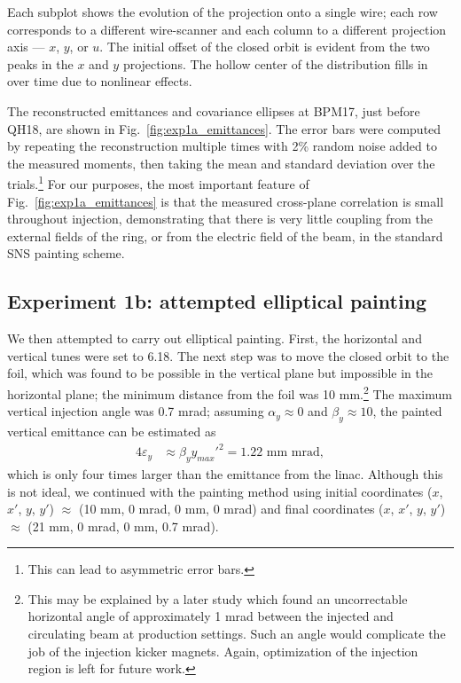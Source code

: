 %
Each subplot shows the evolution of the projection onto a single wire; each row corresponds to a different wire-scanner and each column to a different projection axis — $x$, $y$, or $u$. The initial offset of the closed orbit is evident from the two peaks in the $x$ and $y$ projections. The hollow center of the distribution fills in over time due to nonlinear effects.

The reconstructed emittances and covariance ellipses at BPM17, just before QH18, are shown in Fig.~\ref{fig:exp1a_emittances}. The error bars were computed by repeating the reconstruction multiple times with 2\% random noise added to the measured moments, then taking the mean and standard deviation over the trials.\footnote{This can lead to asymmetric error bars.} For our purposes, the most important feature of Fig.~\ref{fig:exp1a_emittances} is that the measured cross-plane correlation is small throughout injection, demonstrating that there is very little coupling from the external fields of the ring, or from the electric field of the beam, in the standard SNS painting scheme.


\subsection{Experiment 1b: attempted elliptical painting}

We then attempted to carry out elliptical painting. First, the horizontal and vertical tunes were set to 6.18. The next step was to move the closed orbit to the foil, which was found to be possible in the vertical plane but impossible in the horizontal plane; the minimum distance from the foil was 10 mm.\footnote{This may be explained by a later study which found an uncorrectable horizontal angle of approximately 1 mrad between the injected and circulating beam at production settings. Such an angle would complicate the job of the injection kicker magnets. Again, optimization of the injection region is left for future work.} The maximum vertical injection angle was 0.7 mrad; assuming $\alpha_y \approx 0$ and $\beta_y \approx 10$, the painted vertical emittance can be estimated as
%
\begin{equation}
\begin{aligned}
    4\varepsilon_y 
    &\approx \beta_y {y_{max}'}^2
    = 1.22 \,\, \text{mm~mrad},
\end{aligned}
\end{equation}
%
which is only four times larger than the emittance from the linac. Although this is not ideal, we continued with the painting method using initial coordinates ($x$, $x'$, $y$, $y'$) $\approx$ (10 mm, 0 mrad, 0 mm, 0 mrad) and final coordinates ($x$, $x'$, $y$, $y'$) $\approx$ (21 mm, 0 mrad, 0 mm, 0.7 mrad).

